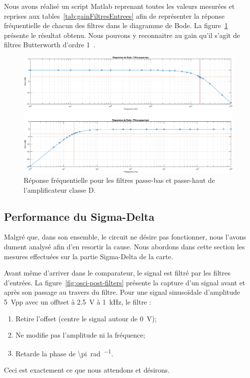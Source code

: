 \documentclass[10pt, oneside, a4paper]{article}
\begin{document}
Nous avons réalisé un script Matlab\textregistered{} reprenant toutes les valeurs mesurées et reprises aux tables~\ref{tab:gainFiltresEntrees} afin de représenter la réponse fréquentielle de chacun des filtres dans le diagramme de Bode.
La figure~\ref{fig:resultatRepFreq} présente le résultat obtenu.
Nous pouvons y reconnaitre au gain qu'il s'agit de filtres Butterworth d'ordre 1~\cite{Horowitz:2015aa}.
\begin{figure}[!ht]
    \centering
    \includegraphics[width=\textwidth]{eps/bode-filtres.eps}
    \caption{Réponse fréquentielle pour les filtres passe-bas
             et passe-haut de l'amplificateur classe D.}
    \label{fig:resultatRepFreq}
\end{figure}

\subsection{Performance du Sigma-Delta}
Malgré que, dans son ensemble, le circuit ne désire pas fonctionner, nous l'avons dument analysé afin d'en resortir la cause.
Nous abordons dans cette section les mesures effectuées sur la partie Sigma-Delta de la carte.

Avant même d'arriver dans le comparateur, le signal est filtré par les filtres d'entrées.
La figure~\ref{fig:osci-post-filters} présente la capture d'un signal avant et après son passage au travers du filtre.
Pour une signal sinusoïdale d'amplitude \SI{5}{\volt}pp avec un offtset à \SI{2.5}{\volt} à \SI{1}{\kilo\hertz}, le filtre :
\begin{enumerate}
    \item Retire l'offset (centre le signal autour de \SI{0}{\volt});
    \item Ne modifie pas l'amplitude ni la fréquence;
    \item Retarde la phase de \SI{\pi}{\radian\per\sec}.
\end{enumerate}
Ceci est exactement ce que nous attendons et désirons.
\end{document}
